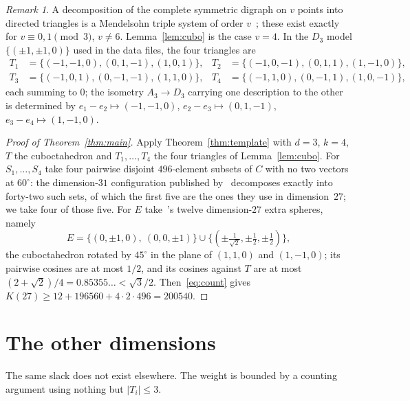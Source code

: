 \documentclass[11pt,reqno]{amsart}
\theoremstyle{plain}
\theoremstyle{remark}
\newtheorem{remark}[theorem]{Remark}
\begin{document}
\begin{remark}
A decomposition of the complete symmetric digraph on $v$ points into directed
triangles is a Mendelsohn triple system of order $v$~\cite{Mendelsohn1971}; these
exist exactly for $v \equiv 0,1 \pmod 3$, $v \ne 6$.  Lemma~\ref{lem:cubo} is the
case $v = 4$.  In the $D_{3}$ model $\{(\pm1,\pm1,0)\}$ used in the data files,
the four triangles are
\[
  \begin{aligned}
    T_{1} &= \{(-1,-1,0),(0,1,-1),(1,0,1)\}, &
    T_{2} &= \{(-1,0,-1),(0,1,1),(1,-1,0)\}, \\
    T_{3} &= \{(-1,0,1),(0,-1,-1),(1,1,0)\}, &
    T_{4} &= \{(-1,1,0),(0,-1,1),(1,0,-1)\},
  \end{aligned}
\]
each summing to $0$; the isometry $A_{3} \to D_{3}$ carrying one description to
the other is determined by $e_{1}-e_{2} \mapsto (-1,-1,0)$,
$e_{2}-e_{3} \mapsto (0,1,-1)$, $e_{3}-e_{4} \mapsto (1,-1,0)$.
\end{remark}

\begin{proof}[Proof of Theorem~\ref{thm:main}]
Apply Theorem~\ref{thm:template} with $d = 3$, $k = 4$, $T$ the cuboctahedron and
$T_{1},\dots,T_{4}$ the four triangles of Lemma~\ref{lem:cubo}.  For
$S_{1},\dots,S_{4}$ take four pairwise disjoint $496$-element subsets of $C$ with
no two vectors at $60^{\circ}$: the dimension-$31$ configuration published
by~\cite{Ma2025} decomposes exactly into forty-two such sets, of which the first
five are the ones they use in dimension~$27$; we take four of those five.  For
$E$ take~\cite{Ma2025}'s twelve dimension-$27$ extra spheres, namely
\[
  E = \bigl\{(0,\pm1,0),\ (0,0,\pm1)\bigr\} \cup
      \bigl\{(\pm\tfrac{1}{\sqrt2},\pm\tfrac12,\pm\tfrac12)\bigr\},
\]
the cuboctahedron rotated by $45^{\circ}$ in the plane of $(1,1,0)$ and
$(1,-1,0)$; its pairwise cosines are at most $1/2$, and its cosines against $T$
are at most $(2+\sqrt2)/4 = 0.85355\ldots < \sqrt3/2$.  Then~\eqref{eq:count}
gives $K(27) \ge 12 + 196560 + 4\cdot 2\cdot 496 = 200540$.
\end{proof}

\section{The other dimensions}\label{sec:optimality}

The same slack does not exist elsewhere.  The weight is bounded by a counting
argument using nothing but $|T_{i}| \le 3$.
\end{document}

